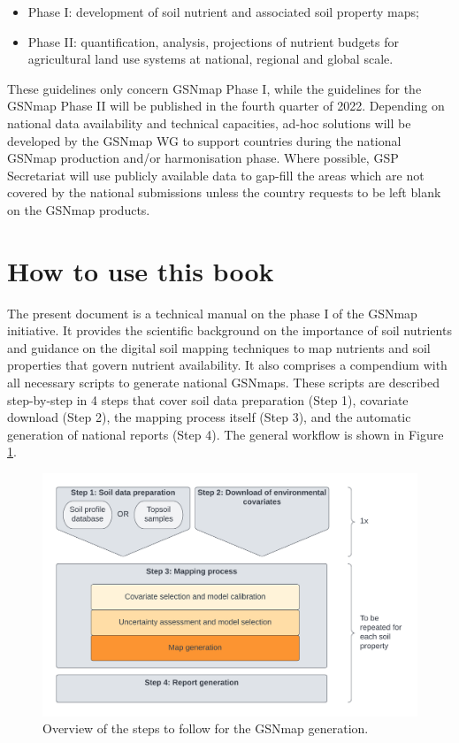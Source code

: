 \documentclass[
  10pt,
  b5paper,
  oneside]{book}
\providecommand{\tightlist}{%
  \setlength{\itemsep}{0pt}\setlength{\parskip}{0pt}}
\begin{document}
\begin{itemize}
\tightlist
\item
  Phase I: development of soil nutrient and associated soil property maps;
\item
  Phase II: quantification, analysis, projections of nutrient budgets for agricultural land use systems at national, regional and global scale.
\end{itemize}

These guidelines only concern GSNmap Phase I, while the guidelines for the GSNmap Phase II will be published in the fourth quarter of 2022.
Depending on national data availability and technical capacities, ad-hoc solutions will be developed by the GSNmap WG to support countries during the national GSNmap production and/or harmonisation phase. Where possible, GSP Secretariat will use publicly available data to gap-fill the areas which are not covered by the national submissions unless the country requests to be left blank on the GSNmap products.

\hypertarget{how-to-use-this-book}{%
\section{How to use this book}\label{how-to-use-this-book}}

The present document is a technical manual on the phase I of the GSNmap initiative. It provides the scientific background on the importance of soil nutrients and guidance on the digital soil mapping techniques to map nutrients and soil properties that govern nutrient availability. It also comprises a compendium with all necessary scripts to generate national GSNmaps. These scripts are described step-by-step in 4 steps that cover soil data preparation (Step 1), covariate download (Step 2), the mapping process itself (Step 3), and the automatic generation of national reports (Step 4). The general workflow is shown in Figure \ref{fig:steps}.

\begin{figure}
\includegraphics[width=28.12in]{images/Manual-Workflow} \caption{Overview of the steps to follow for the GSNmap generation.}\label{fig:steps}
\end{figure}
\end{document}
